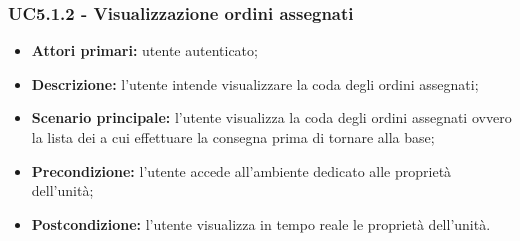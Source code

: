         \subsubsection{UC5.1.2 - Visualizzazione ordini assegnati}
        \begin{itemize}
            \item \textbf{Attori primari:} utente autenticato;
            \item \textbf{Descrizione:} l'utente intende visualizzare la coda degli ordini assegnati;
            \item \textbf{Scenario principale:} l'utente visualizza la coda degli ordini assegnati ovvero la lista dei  a cui effettuare la consegna prima di tornare alla base;
            \item \textbf{Precondizione:} l'utente accede all'ambiente dedicato alle proprietà dell'unità;
            \item \textbf{Postcondizione:} l'utente visualizza in tempo reale le proprietà dell'unità.
        \end{itemize}


